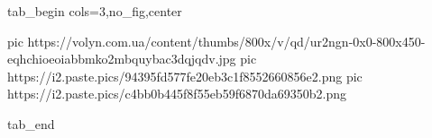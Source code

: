  
 
 
 
 

\ifcmt
  tab_begin cols=3,no_fig,center

     pic https://volyn.com.ua/content/thumbs/800x/v/qd/ur2ngn-0x0-800x450-eqhchioeoiabbmko2mbquybac3dqjqdv.jpg
		 pic https://i2.paste.pics/94395fd577fe20eb3c1f8552660856e2.png
		 pic https://i2.paste.pics/c4bb0b445f8f55eb59f6870da69350b2.png

  tab_end
\fi

